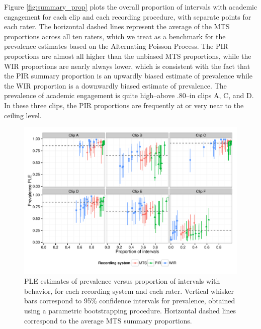 \documentclass[man, noextraspace, floatsintext]{apa6}\usepackage[]{graphicx}\usepackage[]{color}
\makeatletter
\def\maxwidth{ %
  \ifdim\Gin@nat@width>\linewidth
    \linewidth
  \else
    \Gin@nat@width
  \fi
}
\newenvironment{knitrout}{}{} %
\makeatother
\begin{document}
Figure \ref{fig:summary_prop} plots the overall proportion of intervals with academic engagement for each clip and each recording procedure, with separate points for each rater. The horizontal dashed lines represent the average of the MTS proportions across all ten raters, which we treat as a benchmark for the prevalence estimates based on the Alternating Poisson Process. The PIR proportions are almost all higher than the unbiased MTS proportions, while the WIR proportions are nearly always lower, which is consistent with the fact that the PIR summary proportion is an upwardly biased estimate of prevalence while the WIR proportion is a downwardly biased estimate of prevalence. The prevalence of academic engagement is quite high--above .80--in clips A, C, and D. In these three clips, the PIR proportions are frequently at or very near to the ceiling level. 






\begin{knitrout}
\color{fgcolor}\begin{figure}[tb]


{\centering \includegraphics[width=\maxwidth]{fig/johnson_phi_est} 

}

\caption[PLE estimates of prevalence versus proportion of intervals with behavior, for each recording system and each rater]{PLE estimates of prevalence versus proportion of intervals with behavior, for each recording system and each rater. Vertical whisker bars correspond to 95\% confidence intervals for prevalence, obtained using a parametric bootstrapping procedure. Horizontal dashed lines correspond to the average MTS summary proportions.\label{fig:johnson_phi_est}}
\end{figure}


\end{knitrout}
\end{document}
